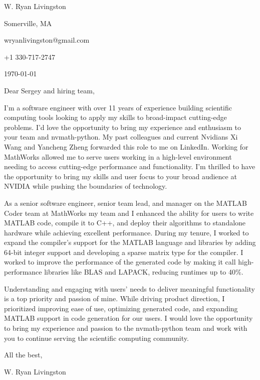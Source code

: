 \documentclass[
    10pt %
]{article}
\begin{document}
\begin{minipage}{\linewidth}
W. Ryan Livingston

Somerville, MA

wryanlivingston@gmail.com

+1 330-717-2747

\today
\end{minipage}


Dear Sergey and hiring team,

I'm a software engineer with over 11 years of experience building scientific computing tools looking to apply my skills to broad-impact cutting-edge problems. I'd love the opportunity to bring my experience and enthusiasm to your team and nvmath-python.
My past colleagues and current Nvidians Xi Wang and Yancheng Zheng forwarded this role to me on LinkedIn. Working for MathWorks allowed me to serve users working in a high-level environment needing to access cutting-edge performance and functionality. I'm thrilled to have the opportunity to bring my skills and user focus to your broad audience at NVIDIA while pushing the boundaries of technology.

As a senior software engineer, senior team lead, and manager on the MATLAB Coder team at MathWorks my team and I enhanced the ability for users to write MATLAB code, compile it to C++, and deploy their algorithms to standalone hardware while achieving excellent performance. During my tenure, I worked to expand the compiler's support for the MATLAB language and libraries by adding 64-bit integer support and developing a sparse matrix type for the compiler. I worked to improve the performance of the generated code by making it call high-performance libraries like BLAS and LAPACK, reducing runtimes up to 40\%.

Understanding and engaging with users' needs to deliver meaningful functionality is a top priority and passion of mine. While driving product direction, I prioritized improving ease of use, optimizing generated code, and expanding MATLAB support in code generation for our users. I would love the opportunity to bring my experience and passion to the nvmath-python team and work with you to continue serving the scientific computing community.

All the best,

W. Ryan Livingston
\end{document}
